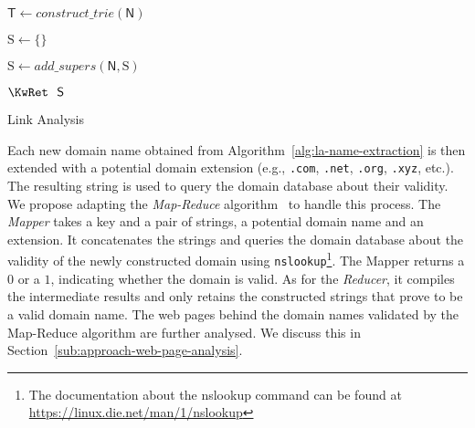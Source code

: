 

\begin{algorithm}[pht!]
    \DontPrintSemicolon

    $\mathsf{T} \gets \mathit{construct\_trie}(\mathsf{N})$\;

    $\mathrm{S} \gets \{\}$\;

    
    $\mathrm{S}\gets\mathit{add\_supers}(\mathsf{N}, \mathrm{S})$\;

    $\KwRet~~\mathsf{S}$\;

    \;

\caption{Link Analysis}
\label{alg:la-name-extraction}
\end{algorithm}

Each new domain name obtained from Algorithm~\ref{alg:la-name-extraction} is then extended with a potential domain extension (e.g., {\texttt{.com}}, {\texttt{.net}}, {\texttt{.org}}, {\texttt{.xyz}}, etc.). The resulting string is used to query the domain database about their validity. We propose adapting the \emph{Map-Reduce} algorithm~\cite{dean-dhemawhat:2008} to handle this process. The \emph{Mapper} takes a key and a pair of strings, a potential domain name and an extension. It concatenates the strings and queries the domain database about the validity of the newly constructed domain using {\texttt{nslookup}}\footnote{The documentation about the nslookup command can be found at \url{https://linux.die.net/man/1/nslookup}}. The Mapper returns a $0$ or a $1$, indicating whether the domain is valid. As for the \emph{Reducer}, it compiles the intermediate results and only retains the constructed strings that prove to be a valid domain name. The web pages behind the domain names validated by the Map-Reduce algorithm are further  analysed. We discuss this in Section~\ref{sub:approach-web-page-analysis}.

